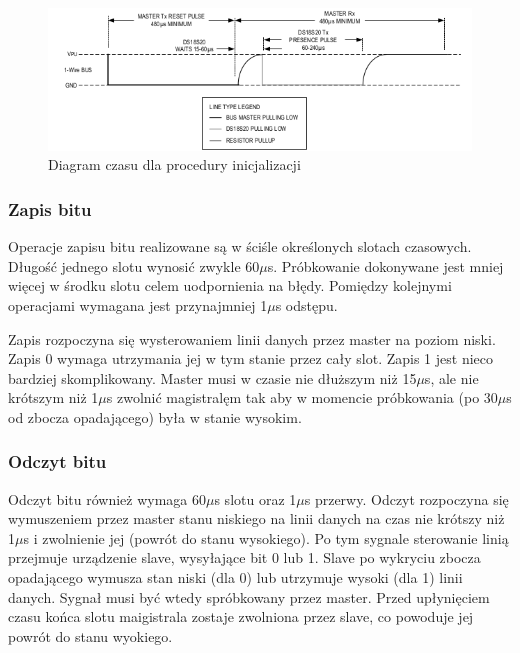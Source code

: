 \documentclass[a4paper]{article}
\begin{document}
\begin{figure}[!h]
\begin{center}
\includegraphics[scale=0.4]{graphics/init.png}
\end{center}
\label{inititming}
\caption{Diagram czasu dla procedury inicjalizacji}
\end{figure}

\subsubsection{Zapis bitu}
Operacje zapisu bitu realizowane są w ściśle określonych slotach czasowych. Długość jednego slotu wynosić zwykle 60$\mu$s. Próbkowanie dokonywane jest mniej więcej w środku slotu celem uodpornienia na błędy. Pomiędzy kolejnymi operacjami wymagana jest przynajmniej 1$\mu$s odstępu.

Zapis rozpoczyna się wysterowaniem linii danych przez master na poziom niski. Zapis 0 wymaga utrzymania jej w tym stanie przez cały slot. Zapis 1 jest nieco bardziej skomplikowany. Master musi w czasie nie dłuższym niż 15$\mu$s, ale nie krótszym niż 1$\mu$s zwolnić magistralęm tak aby w momencie próbkowania (po 30$\mu$s od zbocza opadającego) była w stanie wysokim. 

\subsubsection{Odczyt bitu}
Odczyt bitu również wymaga 60$\mu$s slotu oraz 1$\mu$s przerwy. Odczyt rozpoczyna się wymuszeniem przez master stanu niskiego na linii danych na czas nie krótszy niż 1$\mu$s i zwolnienie jej (powrót do stanu wysokiego). Po tym sygnale sterowanie linią przejmuje urządzenie slave, wysyłające bit 0 lub 1. Slave po wykryciu zbocza opadającego wymusza stan niski (dla 0) lub utrzymuje  wysoki (dla 1) linii danych. Sygnał musi być wtedy spróbkowany przez master. Przed upłynięciem czasu końca slotu maigistrala zostaje zwolniona przez slave, co powoduje jej powrót do stanu wyokiego.
\end{document}
